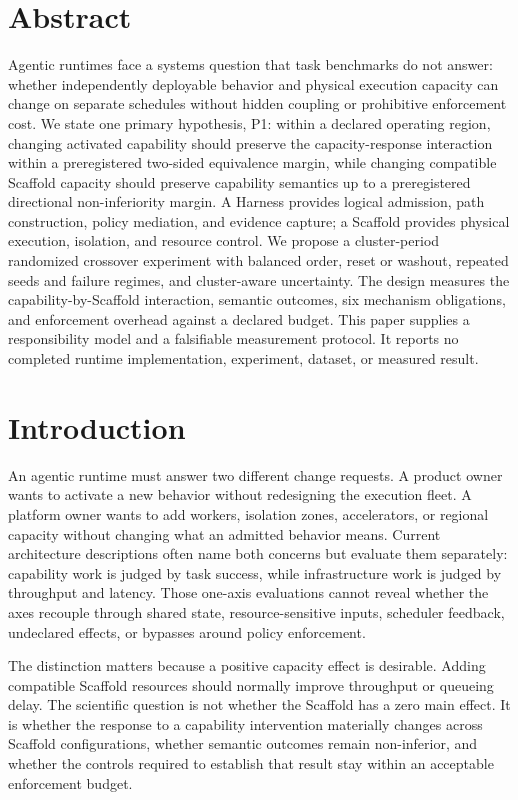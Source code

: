 

\section{Abstract}

Agentic runtimes face a systems question that task benchmarks do not answer: whether independently deployable behavior and physical execution capacity can change on separate schedules without hidden coupling or prohibitive enforcement cost. We state one primary hypothesis, P1: within a declared operating region, changing activated capability should preserve the capacity-response interaction within a preregistered two-sided equivalence margin, while changing compatible Scaffold capacity should preserve capability semantics up to a preregistered directional non-inferiority margin. A Harness provides logical admission, path construction, policy mediation, and evidence capture; a Scaffold provides physical execution, isolation, and resource control. We propose a cluster-period randomized crossover experiment with balanced order, reset or washout, repeated seeds and failure regimes, and cluster-aware uncertainty. The design measures the capability-by-Scaffold interaction, semantic outcomes, six mechanism obligations, and enforcement overhead against a declared budget. This paper supplies a responsibility model and a falsifiable measurement protocol. It reports no completed runtime implementation, experiment, dataset, or measured result.

\section{Introduction}
\label{sec:introduction}

An agentic runtime must answer two different change requests. A product owner wants to activate a new behavior without redesigning the execution fleet. A platform owner wants to add workers, isolation zones, accelerators, or regional capacity without changing what an admitted behavior means. Current architecture descriptions often name both concerns but evaluate them separately: capability work is judged by task success, while infrastructure work is judged by throughput and latency. Those one-axis evaluations cannot reveal whether the axes recouple through shared state, resource-sensitive inputs, scheduler feedback, undeclared effects, or bypasses around policy enforcement.

The distinction matters because a positive capacity effect is desirable. Adding compatible Scaffold resources should normally improve throughput or queueing delay. The scientific question is not whether the Scaffold has a zero main effect. It is whether the response to a capability intervention materially changes across Scaffold configurations, whether semantic outcomes remain non-inferior, and whether the controls required to establish that result stay within an acceptable enforcement budget.

